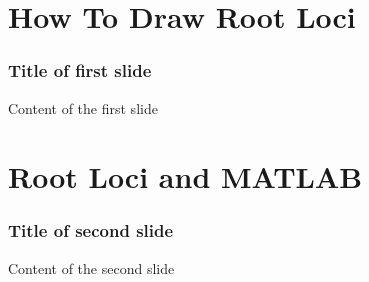 \section{How To Draw Root Loci}

\begin{frame}
	\frametitle{Title of first slide}
	Content of the first slide
\end{frame}

\section{Root Loci and MATLAB}

\begin{frame}
	\frametitle{Title of second slide}
	Content of the second slide
\end{frame}